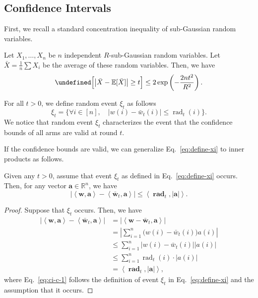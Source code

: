 \documentclass{article}
\newcommand{\RR}{\mathbb R}
\DeclareMathOperator{\rad}{rad}
\let\Pr\undefined
\DeclareMathOperator{\Pr}{Pr}
\newcommand{\inn}[1]{\left\langle #1 \right\rangle}
\renewcommand{\vec}[1]{\boldsymbol{#1}}
\begin{document}
\subsection{Confidence Intervals}

First, we recall a standard concentration inequality of sub-Gaussian random variables.
\begin{lemma}
\label{lemma:hoeffeding}
Let $X_1,\ldots, X_n$ be $n$ independent $R$-sub-Gaussian random variables. 
Let $\bar X=\frac{1}{n}\sum X_i$ be the average of these random variables.
Then, we have
$$
\Pr\Big[ \big|\bar X - \mathbb E[\bar X] \big| \ge t \Big] \le 
2\exp\left(-\frac{2nt^2}{R^2}\right).
$$
\end{lemma}


For all $t>0$, we define random event $\xi_t$ as follows
\begin{equation}
\xi_t = \Big\{
\forall i\in[n],\quad 
|w(i)-\bar w_t(i)| \le \rad_t(i) 
\Big\}.
\label{eq:define-xi}
\end{equation}
We notice that random event $\xi_t$ characterizes the event that the confidence bounds of all arms are valid at round $t$.

If the confidence bounds are valid, we can generalize Eq.~\eqref{eq:define-xi} to inner products as follows.
\begin{lemma}
\label{lemma:ci-property}
Given any $t>0$, assume that event $\xi_t$ as defined in Eq.~\eqref{eq:define-xi} occurs. 
Then, for any vector $\vec a \in \RR^n$, we have
$$
\big|\inn{\vec w,\vec a} - \inn{\vec {\bar w}_t, \vec a}\big| \le \inn{\vec \rad_t, |\vec a|}.
$$
\end{lemma}

\begin{proof}
Suppose that $\xi_t$ occurs. Then, we have
\begin{align}
\big|\inn{\vec w,\vec a} - \inn{\vec {\bar w}_t, \vec a}\big| 
&=\big|\inn{\vec w-\vec {\bar w}_t,\vec a}\big| \nonumber \\
&=\left|\sum_{i=1}^n \big(w(i)-\bar w_t(i)\big) a(i)  \right| \nonumber \\
&\le\sum_{i=1}^n \big| w(i)-\bar w_t(i)\big| |a(i)| \nonumber \\
&\le\sum_{i=1}^{n} \rad_t(i) \cdot |a(i)| \label{eq:ci-c-1}\\
&= \inn{\vec \rad_t,  |\vec a|}, \nonumber
\end{align}
where Eq.~\eqref{eq:ci-c-1} follows the definition of event $\xi_t$ in Eq.~\eqref{eq:define-xi} and the assumption that it occurs.
\end{proof}
\end{document}
